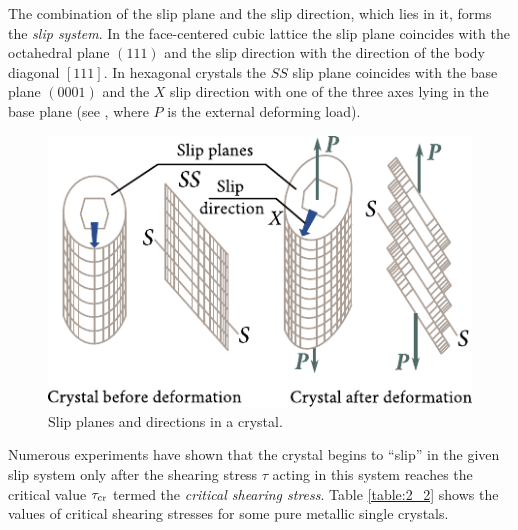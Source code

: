 The combination of the slip plane and the slip direction, which lies in it, forms the \textit{slip system}. In the face-centered cubic lattice the slip plane coincides with the octahedral plane $(111)$ and the slip direction with the direction of the body diagonal $[111]$. In hexagonal crystals the $SS$ slip plane coincides with the base plane $(0001)$ and the $X$ slip direction with one of the three axes lying in the base plane (see , where $P$ is the external deforming load).

\begin{figure}[t]
	\begin{center}
		\includegraphics[scale=1.0]{figures/ch_02/fig_2_5.pdf}
		\caption[]{Slip planes and directions in a crystal.}
		\label{fig:2_5}
	\end{center}
	\vspace{-0.7cm}
\end{figure}

Numerous experiments have shown that the crystal begins to ``slip'' in the given slip system only after the shearing stress $\tau$ acting in this system reaches the critical value $\tau_{\text{cr}}$ termed the \textit{critical shearing stress}. Table \ref{table:2_2} shows the values of critical shearing stresses for some pure metallic single crystals.

